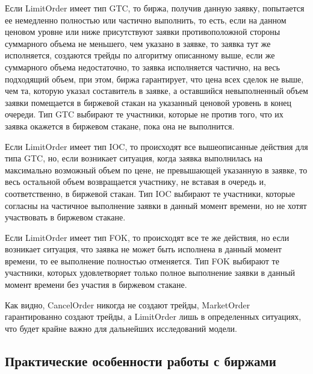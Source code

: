 \documentclass[12pt, a4paper]{article}
\begin{document}
Если LimitOrder имеет тип GTC, то биржа, получив данную заявку, попытается ее немедленно полностью или частично выполнить, то есть, если на данном ценовом уровне или ниже присутствуют заявки противоположной стороны суммарного объема не меньшего, чем указано в заявке, то заявка тут же исполняется, создаются трейды по алгоритму описанному выше, если же суммарного объема недостаточно, то заявка исполняется частично, на весь подходящий объем, при этом, биржа гарантирует, что цена всех сделок не выше, чем та, которую указал составитель в заявке, а оставшийся невыполненный объем заявки помещается в биржевой стакан на указанный ценовой уровень в конец очереди. Тип GTC выбирают те участники, которые не против того, что их заявка окажется в биржевом стакане, пока она не выполнится. 

Если LimitOrder имеет тип IOC, то происходят все вышеописанные действия для типа GTC, но, если возникает ситуация, когда заявка выполнилась на максимально возможный объем по цене, не превышающей указанную в заявке, то весь остальной объем возвращается участнику, не вставая в очередь и, соответственно, в биржевой стакан. Тип IOC выбирают те участники, которые согласны на частичное выполнение заявки в данный момент времени, но не хотят участвовать в биржевом стакане.

Если LimitOrder имеет тип FOK, то происходят все те же действия, но если возникает ситуация, что заявка не может быть исполнена в данный момент времени, то ее выполнение полностью отменяется. Тип FOK выбирают те участники, которых удовлетворяет только полное выполнение заявки в данный момент времени без участия в биржевом стакане.

Как видно, CancelOrder никогда не создают трейды, MarketOrder гарантированно создают трейды, а LimitOrder лишь в определенных ситуациях, что будет крайне важно для дальнейших исследований модели.

\subsection{Практические особенности работы с биржами}










\begin{comment}
\subsection{Практические особенности работы с биржами}
\section{Модель}
\section{Практические результаты}

\hypertarget{qrm}
\end{comment}
\end{document}
